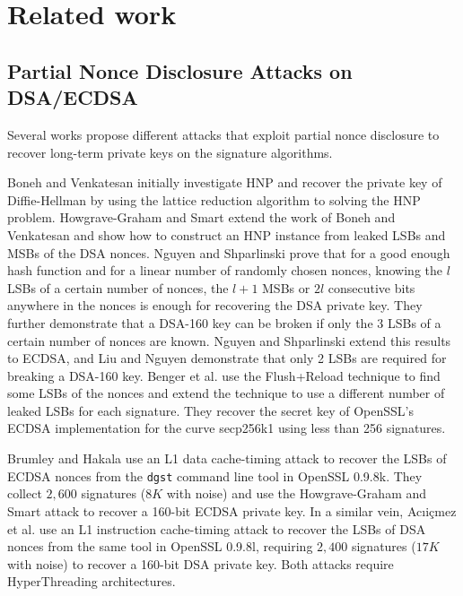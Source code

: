 \section{Related work}
\label{sec:relatedwork}
\subsection{Partial Nonce Disclosure Attacks on DSA/ECDSA}
Several works propose different attacks that exploit partial nonce disclosure to recover long-term private keys on the signature algorithms.


Boneh and Venkatesan \cite{boneh1996} initially investigate HNP and recover the private key of Diffie-Hellman by using the lattice reduction algorithm to solving the HNP problem.
Howgrave-Graham and Smart \cite{HG2001} extend the work of Boneh and Venkatesan \cite{boneh1996} and  show how to construct an HNP instance from leaked LSBs and MSBs of the DSA nonces.
Nguyen and Shparlinski \cite{Nguyen2002} prove that for a good enough hash function and for a linear number of randomly chosen nonces, knowing the $l$ LSBs of a certain number of nonces, the $l+1$ MSBs or $2l$ consecutive bits anywhere in the nonces is enough for recovering the DSA private key.
 They further demonstrate that a DSA-160 key can be broken if only the $3$ LSBs of a certain number of nonces are known.
Nguyen and Shparlinski \cite{Nguyen2003} extend this results to ECDSA,
and Liu and Nguyen \cite{Liu2013} demonstrate that only 2 LSBs are required for breaking a DSA-160 key.
 Benger et al. \cite{Benger2014} use the Flush+Reload technique to find some LSBs of the nonces
  and extend the technique to use a different number of leaked LSBs for each signature.
 They recover the secret key of OpenSSL's ECDSA implementation for the curve secp256k1 using less than 256 signatures.

Brumley and Hakala \cite{Brumley2009} use an L1 data cache-timing attack to recover the LSBs of ECDSA nonces from the \verb+dgst+ command line tool in OpenSSL 0.9.8k.
 They collect $2,600$ signatures ($8K$ with noise) and use the Howgrave-Graham and Smart \cite{HG2001} attack to recover a 160-bit ECDSA private key.
In a similar vein, Ac{\i}i{\c{c}}mez et al. \cite{Brumley2010} use an L1 instruction cache-timing attack to recover the LSBs of DSA nonces from the same tool in OpenSSL 0.9.8l, requiring $2,400$ signatures ($17K$ with noise) to recover a 160-bit DSA private key.
 Both attacks require HyperThreading architectures.

